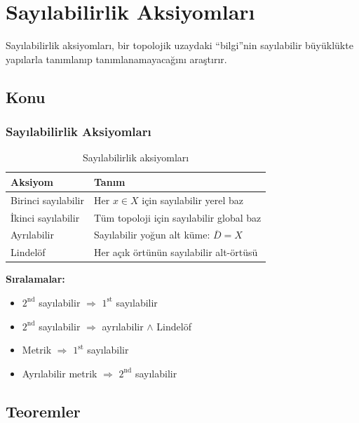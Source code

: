 \chapter{Sayılabilirlik Aksiyomları}

Sayılabilirlik aksiyomları, bir topolojik uzaydaki ``bilgi''nin sayılabilir büyüklükte
yapılarla tanımlanıp tanımlanamayacağını araştırır.

\section{Konu}

\subsection{Sayılabilirlik Aksiyomları}

\begin{table}[h]
\centering
\begin{tabular}{ll}
\toprule
\textbf{Aksiyom} & \textbf{Tanım} \\
\midrule
Birinci sayılabilir & Her $x \in X$ için sayılabilir yerel baz \\
İkinci sayılabilir & Tüm topoloji için sayılabilir global baz \\
Ayrılabilir & Sayılabilir yoğun alt küme: $\overline{D} = X$ \\
Lindelöf & Her açık örtünün sayılabilir alt-örtüsü \\
\bottomrule
\end{tabular}
\caption{Sayılabilirlik aksiyomları}
\end{table}

\textbf{Sıralamalar:}
\begin{itemize}
  \item $2^{\text{nd}}$ sayılabilir $\Rightarrow$ $1^{\text{st}}$ sayılabilir
  \item $2^{\text{nd}}$ sayılabilir $\Rightarrow$ ayrılabilir $\wedge$ Lindelöf
  \item Metrik $\Rightarrow$ $1^{\text{st}}$ sayılabilir
  \item Ayrılabilir metrik $\Rightarrow$ $2^{\text{nd}}$ sayılabilir
\end{itemize}

\section{Teoremler}

